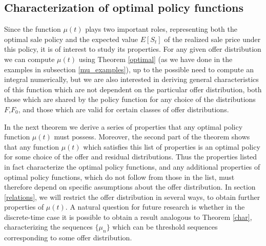 \documentclass{article}
\numberwithin{equation}{section}
\begin{document}
	
	\label{relations}
	
	
	\subsection{Characterization of optimal policy functions}
	\label{characterization}
	
	Since the function $\mu(t)$ plays two important roles, representing both the optimal sale policy and the expected value $E[S_t]$ of the realized sale price under this policy, it is 
	of interest to study its properties. For any given 
	offer distribution we can compute $\mu(t)$ using Theorem \ref{optimal} (as we have done in the examples in subsection \ref{mu_examples}), up to the possible
	need to compute an integral numerically, but we are also interested in deriving general characteristics of this function which are not dependent on the particular offer distribution, both those which are shared by the policy function for any choice of the distributions $F$,$F_0$, and those which are
	valid for certain classes of offer distributions.
	
	
	In the next theorem we derive a series 
	of properties that any optimal policy function $\mu(t)$ must possess. Moreover,
	the second part of the theorem shows
	that any function $\mu(t)$ which satisfies this list of properties is an optimal policy for some choice of the offer and residual distributions. Thus the properties listed in fact characterize the optimal policy functions, and any additional properties of optimal policy functions, which do not 
	follow from those in the list, must therefore depend on specific assumptions about the offer distribution. In section \ref{relations}, we will restrict 
	the offer distribution in several ways, to obtain further properties of $\mu(t)$. A natural question for future research is whether in the discrete-time case it is possible to obtain a result analogous to Theorem \ref{char}, characterizing the sequences $\{\mu_n\}$ which can be threshold sequences corresponding to some offer distribution.
	
\end{document}
